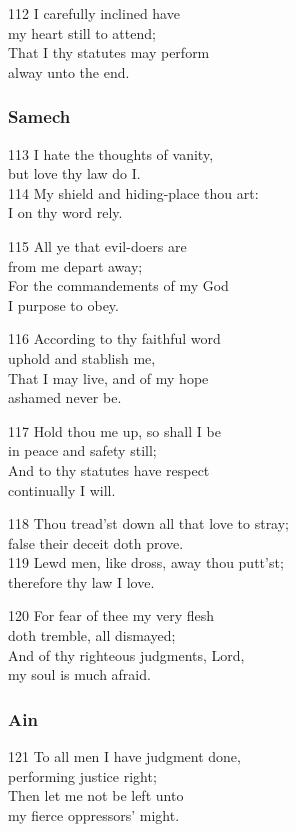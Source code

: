 112 I carefully inclined have\\
my heart still to attend;\\
That I thy statutes may perform\\
alway unto the end.

\subsubsection*{Samech}

113 I hate the thoughts of vanity,\\
but love thy law do I.\\
114 My shield and hiding-place thou art:\\
I on thy word rely.

115 All ye that evil-doers are\\
from me depart away;\\
For the commandements of my God\\
I purpose to obey.

116 According to thy faithful word\\
uphold and stablish me,\\
That I may live, and of my hope\\
ashamed never be.

117 Hold thou me up, so shall I be\\
in peace and safety still;\\
And to thy statutes have respect\\
continually I will.

118 Thou tread’st down all that love to stray;\\
false their deceit doth prove.\\
119 Lewd men, like dross, away thou putt’st;\\
therefore thy law I love.

120 For fear of thee my very flesh\\
doth tremble, all dismayed;\\
And of thy righteous judgments, Lord,\\
my soul is much afraid.

\subsubsection*{Ain}

121 To all men I have judgment done,\\
performing justice right;\\
Then let me not be left unto\\
my fierce oppressors’ might.

